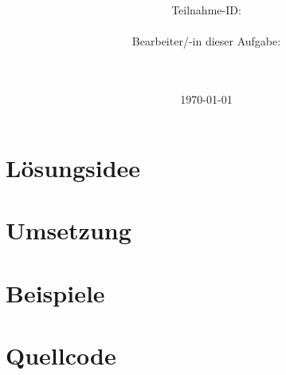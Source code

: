 \documentclass[a4paper,10pt,ngerman]{scrartcl}
\title{\textbf{\Huge\Aufgabe}}
\author{\LARGE Teilnahme-ID: \LARGE \TeilnahmeId \\\\
	    \LARGE Bearbeiter/-in dieser Aufgabe: \\ 
	    \LARGE \Name\\\\}
\date{\LARGE\today}
\begin{document}
  \maketitle
  \tableofcontents
  \vspace{4cm}
  \section{Lösungsidee}
  \section{Umsetzung}
  \section{Beispiele}
  \section{Quellcode}
\end{document}
